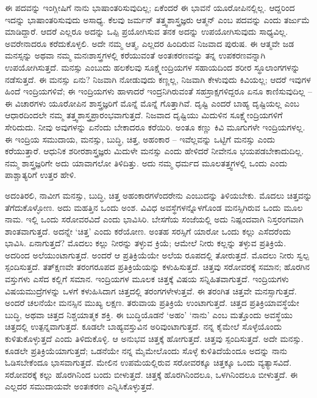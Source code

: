 ಈ ಪದವನ್ನು ಇಂಗ್ಲೀಷಿಗೆ ನಾನು ಭಾಷಾಂತರಿಸುವುದಿಲ್ಲ; ಏಕೆಂದರೆ ಈ ಭಾವನೆ ಯೂರೋಪಿನಲ್ಲಿಲ್ಲ. ಆದ್ದರಿಂದ ಇದನ್ನು ಭಾಷಾಂತರಿಸುವುದು ಅಸಾಧ್ಯ. ಕೆಲವು ಜರ್ಮನ್​ ತತ್ತ್ವಶಾಸ್ತ್ರಜ್ಞರು ಆತ್ಮನ್​ ಎಂಬ ಪದವನ್ನು  ಎಂದು ತರ್ಜುಮೆ ಮಾಡಿದ್ದಾರೆ. ಆದರೆ ಎಲ್ಲರೂ ಅದನ್ನು ಒಪ್ಪಿ ಪ್ರಯೋಗಿಸುವ ತನಕ ಅದನ್ನು ಉಪಯೋಗಿಸುವುದು ಸಾಧ್ಯವಿಲ್ಲ. ಅವರೇನಾದರೂ ಕರೆದುಕೊಳ್ಳಲಿ. ಅದೇ ನಮ್ಮ ಆತ್ಮ, ಎಲ್ಲದರ ಹಿಂದಿರುವ ನಿಜವಾದ ಪುರುಷ. ಈ ಆತ್ಮವೇ ಜಡ ಮನಸ್ಸನ್ನು ಅಥವಾ ನಮ್ಮ ಮನಃಶಾಸ್ತ್ರಗಳಲ್ಲಿ ಕರೆಯುವಂತೆ ಅಂತಃಕರಣವನ್ನು ತನ್ನ ಉಪಕರಣವನ್ನಾಗಿ ಉಪಯೋಗಿಸುತ್ತದೆ. ಮನಸ್ಸು ಎಂಬುದು ಹಲಕೆಲವು ಸೂಕ್ಷ್ಮೇಂದ್ರಿಯಗಳ ಸಹಾಯದಿಂದ ಶರೀರ ಸ್ಥೂಲಾಂಗಗಳನ್ನು ನಡೆಸುತ್ತದೆ. ಈ ಮನಸ್ಸು ಏನು? ನಿಜವಾಗಿ ನೋಡುವುದು ಕಣ್ಣಲ್ಲ, ನಿಜವಾಗಿ ಕೇಳುವುದು ಕಿವಿಯಲ್ಲ; ಆದರೆ ಇವುಗಳ ಹಿಂದೆ ಇಂದ್ರಿಯಗಳಿವೆ; ಈ ಇಂದ್ರಿಯಗಳು ಹಾಳಾದರೆ ಇಂದ್ರನಿಗಿರುವಂತೆ ಸಹಸ್ರಾಕ್ಷಗಳಿದ್ದರೂ ಏನೂ ಕಾಣಿಸುವುದಿಲ್ಲ – ಈ ವಿಚಾರಗಳು ಯೂರೋಪಿನ ಶಾಸ್ತ್ರಜ್ಞರಿಗೆ ಮೊನ್ನೆ ಮೊನ್ನೆ ಗೊತ್ತಾಗಿವೆ. ದೃಷ್ಟಿ ಎಂದರೆ ಬಾಹ್ಯ ದೃಷ್ಟಿಯಲ್ಲ ಎಂಬ ಆಧಾರದಿಂದಲೇ ನಮ್ಮ ತತ್ತ್ವಶಾಸ್ತ್ರಪ್ರಾರಂಭವಾಗುತ್ತದೆ. ನಿಜವಾದ ದೃಷ್ಟಿಯು ಮಿದುಳಿನ ಸೂಕ್ಷ್ಮೇಂದ್ರಿಯಗಳಿಗೆ ಸೇರಿದುದು. ನೀವು ಅವುಗಳನ್ನು ಏನೆಂದು ಬೇಕಾದರೂ ಕರೆಯಿರಿ. ಅಂತೂ ಕಣ್ಣು ಕಿವಿ ಮೂಗುಗಳೇ ಇಂದ್ರಿಯಗಳಲ್ಲ. ಈ ಇಂದ್ರಿಯ ಸಮುದಾಯ, ಮನಸ್ಸು, ಬುದ್ಧಿ, ಚಿತ್ತ, ಅಹಂಕಾರ – ಇವೆಲ್ಲವನ್ನು ಒಟ್ಟಿಗೆ ಮನಸ್ಸು  ಎಂದು ಕರೆಯುತ್ತಾರೆ. ಆಧುನಿಕ ಶರೀರಶಾಸ್ತ್ರಜ್ಞರು ಮಿದುಳೇ ಮನಸ್ಸು ಎಂದು ಹೇಳಿದರೆ ನೀವೇನೂ ಭಯಪಡಬೇಕಾದುದಿಲ್ಲ. ನಮ್ಮ ಶಾಸ್ತ್ರಜ್ಞರಿಗೇ ಅದು ಯಾವಾಗಲೋ ತಿಳಿದಿತ್ತು. ಅದು ನಮ್ಮ ಧರ್ಮದ ಮೂಲತತ್ತ್ವಗಳಲ್ಲಿ ಒಂದು ಎಂದು ಪಾಶ್ಚಾತ್ಯರಿಗೆ ಉತ್ತರ ಹೇಳಿ.

ಅದಂತಿರಲಿ, ನಾವೀಗ ಮನಸ್ಸು, ಬುದ್ಧಿ, ಚಿತ್ತ ಅಹಂಕಾರಗಳೆಂದರೇನು ಎಂಬುದನ್ನು ತಿಳಿಯಬೇಕು. ಮೊದಲು ಚಿತ್ತವನ್ನು ತೆಗೆದುಕೊಳ್ಳೋಣ. ಅದು ಮಹತ್ತಿನ ಒಂದು ಅಂಶ. ವಿವಿಧ ಅವಸ್ಥೆಗಳನ್ನೊಳಗೊಂಡ ಮನಸ್ಸಿಗಿರುವ ಒಂದು ಮೂಲ ನಾಮ. ಇಲ್ಲಿ ಒಂದು ಸರೋವರವಿದೆ ಎಂದು ಭಾವಿಸಿರಿ. ಬೇಸಗೆಯ ಸಂಜೆಯಲ್ಲಿ ಅದು ನಿಷ್ಪಂದವಾಗಿ ನಿಸ್ತರಂಗವಾಗಿ ಶಾಂತವಾಗುತ್ತದೆ. ಅದನ್ನೇ ‘ಚಿತ್ತ’ ಎಂದು ಕರೆಯೋಣ. ಅಂತಹ ಸರಸ್ಸಿಗೆ ಯಾರೋ ಒಂದು ಕಲ್ಲು ಎಸೆದರೆಂದು ಭಾವಿಸಿ. ಏನಾಗುತ್ತದೆ? ಮೊದಲು ಕಲ್ಲು ನೀರನ್ನು ತಳ್ಳುವ ಕ್ರಿಯೆ; ಆಮೇಲೆ ನೀರು ಕಲ್ಲನ್ನು ತಳ್ಳುವ ಪ್ರತಿಕ್ರಿಯೆ. ಅದರಿಂದ ಅಲೆಯುಂಟಾಗುತ್ತದೆ. ಅಂದರೆ ಆ ಪ್ರತಿಕ್ರಿಯೆಯೇ ಅಲೆಯ ರೂಪದಲ್ಲಿ ತೋರುತ್ತದೆ. ಮೊದಲು ನೀರು ಸ್ವಲ್ಪ ಸ್ಪಂದಿಸುತ್ತದೆ. ತತ್​ಕ್ಷಣವೇ ತರಂಗರೂಪದ ಪ್ರತಿಕ್ರಿಯೆಯನ್ನು ಕಳುಹಿಸುತ್ತದೆ. ಚಿತ್ತವು ಸರೋವರಕ್ಕೆ ಸಮಾನ; ಹೊರಗಿನ ವಸ್ತುಗಳು ಎಸೆದ ಕಲ್ಲಿಗೆ ಸಮಾನ. ಇಂದ್ರಿಯಗಳ ಮೂಲಕ ಚಿತ್ತಕ್ಕೆ ವಿಷಯ ಸನ್ನಿಹಿತವಾಗುತ್ತದೆ. ಇಂದ್ರಿಯಗಳು ವಿಷಯಮುದ್ರೆಗಳನ್ನು ಒಳಗೆ ಕಳುಹಿಸಿದಾಗ ಚಿತ್ತದಲ್ಲಿ ತರಂಗಗಳೇಳುತ್ತವೆ. ಈ ತರಂಗಿತ ಚಿತ್ತವೇ ಮನಸ್ಸಾಗುತ್ತದೆ. ಅಂದರೆ ಚಲನೆಯೇ ಮನಸ್ಸಿನ ಮುಖ್ಯ ಲಕ್ಷಣ. ತರುವಾಯ ಪ್ರತಿಕ್ರಿಯೆ ಉಂಟಾಗುತ್ತದೆ. ಚಿತ್ತದ ಪ್ರತಿಕ್ರಿಯಾವಸ್ಥೆಯೇ ಬುದ್ಧಿ, ಅಥವಾ ಚಿತ್ತದ ನಿಶ್ಚಯಾತ್ಮಕ ಶಕ್ತಿ. ಈ ಬುದ್ಧಿಯೊಡನೆ ‘ಅಹಂ’ ‘ನಾನು’ ಎಂಬ ಮತ್ತೊಂದು ಅವಸ್ಥೆಯು ಚಿತ್ತದಲ್ಲಿ ಉತ್ಪನ್ನವಾಗುತ್ತದೆ. ಕೂಡಲೇ ಬಾಹ್ಯವಸ್ತುವಿನ ಅರಿವುಂಟಾಗುತ್ತದೆ. ನನ್ನ ಕೈಮೇಲೆ ಸೊಳ್ಳೆಯೊಂದು ಕುಳಿತುಕೊಳ್ಳುತ್ತದೆ ಎಂದು ತಿಳಿದುಕೊಳ್ಳಿ. ಆ ಅನುಭವ ಚಿತ್ತಕ್ಕೆ ಹೋಗುತ್ತದೆ. ಚಿತ್ತವು ಸ್ಪಂದಿಸುತ್ತದೆ. ಅದೇ ಮನಸ್ಸು. ಕೂಡಲೇ ಪ್ರತಿಕ್ರಿಯೆಯಾಗುತ್ತದೆ; ಒಡನೆಯೇ ನನ್ನ ಮೈಮೇಲೊಂದು ಸೊಳ್ಳೆ ಕುಳಿತಿದೆಯೆಂದೂ ಅದನ್ನು ನಾನು ಓಡಿಸಬೇಕೆಂದೂ ಭಾಸವಾಗುತ್ತದೆ. ಮೇಲಿನ ಉಪಮೆಯಲ್ಲಿರುವ ಸರೋವರಕ್ಕೂ ಚಿತ್ತಕ್ಕೂ ಒಂದು ವ್ಯತ್ಯಾಸವಿದೆ. ಸರೋವರಕ್ಕೆ ಕಲ್ಲು ಹೊರಗಿನಿಂದ ಬಂದು ಬೀಳುತ್ತದೆ. ಚಿತ್ತಕ್ಕೆ ಹೊರಗಿನಿಂದಲೂ, ಒಳಗಿನಿಂದಲೂ ಬೀಳುತ್ತದೆ. ಈ ಎಲ್ಲದರ ಸಮುದಾಯವೇ ಅಂತಃಕರಣ ಎನ್ನಿಸಿಕೊಳ್ಳುತ್ತದೆ.

